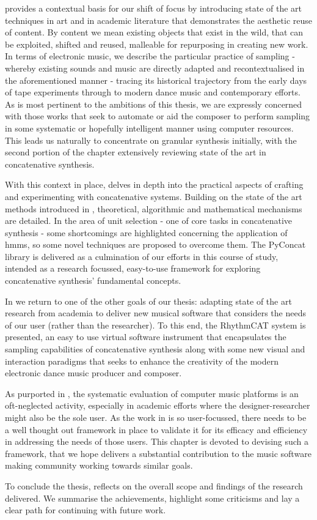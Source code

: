 provides a contextual basis for our shift of focus by introducing state of the art techniques in art and in academic literature that demonstrates the aesthetic reuse of content. By content we mean existing objects that exist in the wild, that can be exploited, shifted and reused, malleable for repurposing in creating new work. In terms of electronic music, we describe the particular practice of sampling - whereby existing sounds and music are directly adapted and recontextualised in the aforementioned manner - tracing its historical trajectory from the early days of tape experiments through to modern dance music and contemporary efforts. As is most pertinent to the ambitions of this thesis, we are expressly concerned with those works that seek to automate or aid the composer to perform sampling in some systematic or hopefully intelligent manner using computer resources. This leads us naturally to concentrate on granular synthesis initially, with the second portion of the chapter extensively reviewing state of the art in concatenative synthesis.

With this context in place,  delves in depth into the practical aspects of crafting and experimenting with concatenative systems. Building on the state of the art methods introduced in , theoretical, algorithmic and mathematical mechanisms are detailed. In the area of unit selection - one of core tasks in concatenative synthesis - some shortcomings are highlighted concerning the application of \acrfull{hmm}s, so some novel techniques are proposed to overcome them. The PyConcat library is delivered as a culmination of our efforts in this course of study, intended as a research focussed, easy-to-use framework for exploring concatenative synthesis’ fundamental concepts.

In  we return to one of the other goals of our thesis: adapting state of the art research from academia to deliver new musical software that considers the needs of our user (rather than the researcher). To this end, the RhythmCAT system is presented, an easy to use virtual software instrument that encapsulates the sampling capabilities of concatenative synthesis along with some new visual and interaction paradigms that seeks to enhance the creativity of the modern electronic dance music producer and composer. 

As purported in , the systematic evaluation of computer music platforms is an oft-neglected activity, especially in academic efforts where the designer-researcher might also be the sole user. As the work in  is so user-focussed,  there needs to be a well thought out framework in place to validate it for its efficacy and efficiency in addressing the needs of those users. This chapter is devoted to devising such a framework, that we hope delivers a substantial contribution to the music software making community working towards similar goals.

To conclude the thesis,  reflects on the overall scope and findings of the research delivered. We summarise the achievements, highlight some criticisms and lay a clear path for continuing with future work. 


 
